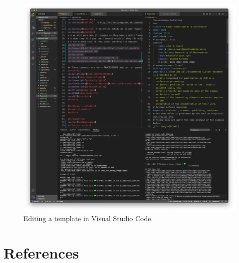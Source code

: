 \documentclass[sigconf,]{acmart}
\makeatletter
\def\maxwidth{\ifdim\Gin@nat@width>\linewidth\linewidth
\else\Gin@nat@width\fi}
\let\Oldincludegraphics\includegraphics
\renewcommand{\includegraphics}[1]{\Oldincludegraphics[width=\maxwidth]{#1}}
\makeatother
\begin{document}
\begin{figure}
\hypertarget{fig:vscode-view}{%
\centering
\includegraphics{images/vscode-view.png}
\caption{Editing a template in Visual Studio
Code.}\label{fig:vscode-view}
}
\end{figure}

  \section{References}
  \balance
  
  
\end{document}
